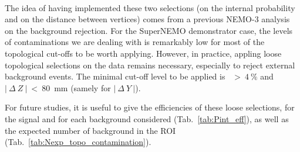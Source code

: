 \paragraph{}The idea of having implemented these two selections (on the internal probability and on the distance between vertices) comes from a previous NEMO-$3$ analysis on the background rejection.
For the SuperNEMO demonstrator case, the levels of contaminations we are dealing with is remarkably low for most of the topological cut-offs to be worth applying.
However, in practice, appling loose topological selections on the data remains necessary, especially to reject external background events.
The minimal cut-off level to be applied is \Pint~$>~4~\%$ and $|~\Delta~Z~|~<~80$~mm (samely for $|~\Delta~Y~|$).

For future studies, it is useful to give the efficiencies of these loose selections, for the signal and for each background considered (Tab.~\ref{tab:Pint_eff}), as well as the expected number of background in the ROI (Tab.~\ref{tab:Nexp_topo_contamination}).

